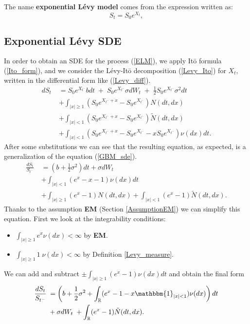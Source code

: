 The name \textbf{exponential Lévy model} comes from the expression written as: 
\begin{equation}\label{ELM}
 S_t = S_0 e^{X_t} ,
\end{equation}

\subsection{Exponential Lévy SDE}\label{Section_ELM33}

In order to obtain an SDE for the process (\ref{ELM}), we apply It\={o} formula (\ref{Ito_form}), and we consider 
the Lévy-It\={o} decomposition (\ref{Levy_Ito}) for $X_t$, written in the differential form like (\ref{Levy_diff}).
\begin{align*}
 d S_t \; &= S_0 e^{X_{t^-}} b dt \; + \; S_0 e^{X_{t^-}} \sigma dW_t \; + \; \frac{1}{2}S_0 e^{X_{t^-}}\sigma^2 dt \\ \nonumber
          &+ \int_{|x|\geq 1} (S_0 e^{X_{t^-}+x} - S_0 e^{X_{t^-}}) N(dt,dx) \\ \nonumber
          &+ \int_{|x|< 1} (S_0 e^{X_{t^-}+x} - S_0 e^{X_{t^-}}) \tilde N(dt,dx) \\  \nonumber
          &+ \int_{|x|< 1} (S_0 e^{X_{t^-}+x} - S_0 e^{X_{t^-}} - x S_0 e^{X_{t^-}}) \nu(dx) dt. \nonumber
\end{align*}
After some substitutions we can see that the resulting equation, as expected, is a generalization of the equation (\ref{GBM_sde}).
\begin{align}
 \frac{d S_t}{S_{t^-}}  \; &= (b + \frac{1}{2}\sigma^2 ) dt + \sigma dW_t \\ \nonumber
                          &+ \int_{|x|< 1} ( e^{x} - x - 1) \nu(dx) dt \\ \nonumber
                          &+ \int_{|x|\geq 1} (e^{x} - 1) N(dt,dx) + \int_{|x|< 1} (e^{x} - 1) \tilde N(dt,dx). \nonumber
\end{align}
Thanks to the assumption \textbf{EM} (Section \ref{AssumptionEM}) we can simplify this equation.
First we look at the integrability conditions:
\begin{itemize}
 \item $\int_{|x|\geq 1}  e^{x} \nu(dx) < \infty$ by \textbf{EM}.  
 \item $\int_{|x|\geq 1} 1\; \nu(dx) < \infty$ by Definition \ref{Levy_measure}.
\end{itemize}
We can add and subtract $\pm \int_{|x|\geq 1} ( e^{x} - 1) \nu(dx) dt $ and obtain the final form
\begin{align} \label{exp_sde}
 \frac{d S_t}{S_{t^-}}  \; &= \left(b + \frac{1}{2}\sigma^2 + \int_{\R} ( e^{x} - 1 -x\mathbbm{1}_{|x|<1}) \nu(dx) \right) dt  \\ \nonumber
                          &+  \sigma dW_t \; + \int_{\R} (e^{x} - 1) \tilde N(dt,dx). \nonumber
\end{align}
